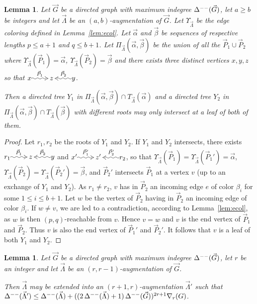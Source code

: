 \documentclass[a4paper]{amsart}
\makeatletter
\newtheorem{lemma}[theorem]{Lemma}
\theoremstyle{definition}
\theoremstyle{remark}
\newcommand\ecol[1]{\Upsilon_{#1}}
\newcommand{\rdens}[1]{\nabla_{#1}}
\DeclareMathOperator\md{\Delta^{\rm --}}
\def\vG{\vec{G}}
\def\vP{\vec{P}}
\def\vL{\vec{\Lambda}}
\newcommand{\rdpath}[1]{\xy\xymatrix{*!{}\ar@{~2>}[r]^{#1}&*!{}}\endxy}
\newcommand{\ldpath}[1]{\xy\xymatrix{*!{}&*!{}\ar@{~2>}[l]_{#1}}\endxy}
\newcommand{\lambd}[5]{{#1}\rdpath{#2}{#3}\ldpath{#4}{#5}}
\makeatother
\begin{document}
\begin{lemma}
  \label{lem:nocross}
  Let $\vG$ be a directed graph with maximum indegree $\md(\vG)$, let
  $a\geq b$ be integers and let $\vL$ be an $(a,b)$-augmentation of
  $\vG$. Let $\ecol{\vL}$ be the edge coloring defined in
  Lemma~\ref{lem:ecol}. Let $\vec{\alpha}$ and $\vec{\beta}$ be
  sequences of respective lengths $p\leq a+1$ and $q\leq b+1$. 
  Let $\Pi_{\vL}(\vec{\alpha},\vec{\beta})$ be the union of all the
  $\vP_1\cup\vP_2$ where $\ecol{\vL}(\vP_1)=\vec{\alpha}$,
  $\ecol{\vL}(\vP_2)=\vec{\beta}$ and there exists three distinct
  vertices $x,y,z$ so that $\lambd{x}{\vP_1}{z}{\vP_2}{y}$.

  Then a directed tree $Y_1$ in
  $\Pi_{\vL}(\vec{\alpha},\vec{\beta})\cap T_{\vL}(\vec{\alpha})$ and
  a directed tree $Y_2$ in $\Pi_{\vL}(\vec{\alpha},\vec{\beta})\cap
  T_{\vL}(\vec{\beta})$ with different roots may only intersect at a
  leaf of both of them.
\end{lemma}
\begin{proof}
Let $r_1,r_2$ be the roots of $Y_1$ and $Y_2$.
If $Y_1$ and $Y_2$ intersects, there exists 
$\lambd{r_1}{\vP_1}{z}{\vP_2}{y}$ and 
$\lambd{x'}{\vP_1'}{z'}{\vP_2'}{r_2}$, so that
$\ecol{\vL}(\vP_1)=\ecol{\vL}(\vP_1')=\vec{\alpha}$,
$\ecol{\vL}(\vP_2)=\ecol{\vL}(\vP_2')=\vec{\beta}$,
and $\vP_2'$ intersects $\vP_1$ at a vertex $v$ (up to an exchange of
 $Y_1$ and $Y_2$). As $r_1\neq r_2$, $v$ has in $\vP_2$ an incoming
 edge $e$ of color $\beta_i$ for some $1\leq i\leq b+1$. Let
 $w$ be the vertex of $\vP_2$ having in $\vP_2$ an incoming edge of
 color $\beta_i$. If $w\neq v$, we are led to a contradiction,
 according to Lemma~\ref{lem:ecol}, as $w$
 is then $(p,q)$-reachable from $v$. Hence $v=w$ and $v$ is the end
 vertex of $\vP_1$ and $\vP_2$. Thus $v$ is also the end vertex of
 $\vP_1'$ and $\vP_2'$. It follows that $v$ is a leaf of both $Y_1$
 and $Y_2$.
\end{proof}
\begin{lemma}
\label{lem:augm}
  Let $\vG$ be a directed graph with maximum indegree $\md(\vG)$, let
  $r$ be an integer and let $\vL$ be an $(r,r-1)$-augmentation of
  $\vG$.

  Then $\vL$ may be extended into an $(r+1,r)$-augmentation $\vL'$
  such that
  $\md(\vL')\leq \md(\vL)+((2\md(\vL)+1)\md(\vG))^{2r+1}\rdens{r}(G)$.
\end{lemma}
\end{document}
